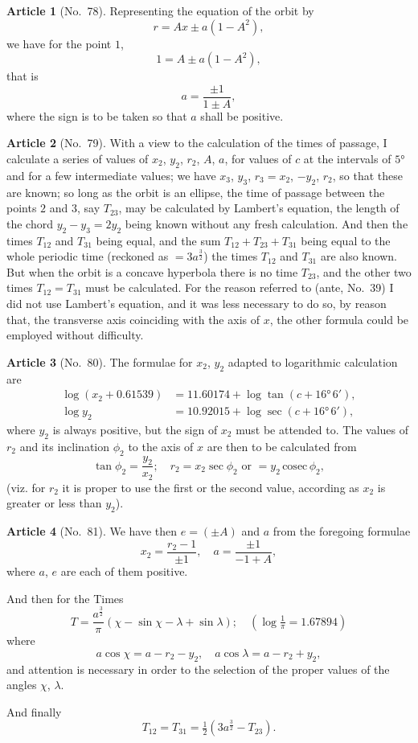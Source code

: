 \documentclass[11pt,a4paper]{article}
\theoremstyle{definition}
\newtheorem{art}{Article}
\begin{document}
\begin{art}[No.~78]
Representing the equation of the orbit by
\[
r = Ax \pm a(1 - A^2),
\]
we have for the point $1$,
\[
1 = A \pm a(1 - A^2),
\]
that is
\[
a = \frac{\pm 1}{1 \pm A},
\]
where the sign is to be taken so that $a$ shall be positive.
\end{art}

\begin{art}[No.~79]
With a view to the calculation of the times of passage, I calculate a series of values of $x_2$, $y_2$, $r_2$, $A$, $a$, for values of $c$ at the intervals of $5°$ and for a few intermediate values; we have $x_3$, $y_3$, $r_3 = x_2$, $-y_2$, $r_2$, so that these are known; so long as the orbit is an ellipse, the time of passage between the points $2$ and $3$, say $T_{23}$, may be calculated by Lambert's equation, the length of the chord $y_2 - y_3 = 2y_2$ being known without any fresh calculation. And then the times $T_{12}$ and $T_{31}$ being equal, and the sum $T_{12} + T_{23} + T_{31}$ being equal to the whole periodic time (reckoned as $= 3a^{\frac{3}{2}}$) the times $T_{12}$ and $T_{31}$ are also known. But when the orbit is a concave hyperbola there is no time $T_{23}$, and the other two times $T_{12} = T_{31}$ must be calculated. For the reason referred to (ante, No.~39) I did not use Lambert's equation, and it was less necessary to do so, by reason that, the transverse axis coinciding with the axis of $x$, the other formula could be employed without difficulty.
\end{art}

\begin{art}[No.~80]
The formulae for $x_2$, $y_2$ adapted to logarithmic calculation are
\begin{align*}
\log(x_2 + 0.61539) &= 11.60174 + \log \tan(c + 16°\, 6'),\\
\log y_2 &= 10.92015 + \log \sec(c + 16°\, 6'),
\end{align*}
where $y_2$ is always positive, but the sign of $x_2$ must be attended to. The values of $r_2$ and its inclination $\phi_2$ to the axis of $x$ are then to be calculated from
\[
\tan \phi_2 = \frac{y_2}{x_2}; \quad r_2 = x_2 \sec \phi_2 \text{ or } = y_2 \, \text{cosec} \, \phi_2,
\]
(viz. for $r_2$ it is proper to use the first or the second value, according as $x_2$ is greater or less than $y_2$).
\end{art}

\begin{art}[No.~81]
We have then $e = (\pm A)$ and $a$ from the foregoing formulae
\[
x_2 = \frac{r_2 - 1}{\pm 1}, \quad a = \frac{\pm 1}{-1 + A},
\]
where $a$, $e$ are each of them positive.

And then for the Times
\[
T = \frac{a^{\frac{3}{2}}}{\pi}(\chi - \sin\chi - \lambda + \sin\lambda); \quad (\log \tfrac{1}{\pi} = 1.67894)
\]
where
\[
a \cos\chi = a - r_2 - y_2, \quad a \cos\lambda = a - r_2 + y_2,
\]
and attention is necessary in order to the selection of the proper values of the angles $\chi$, $\lambda$.

And finally
\[
T_{12} = T_{31} = \tfrac{1}{2}(3a^{\frac{3}{2}} - T_{23}).
\]
\end{art}
\end{document}
